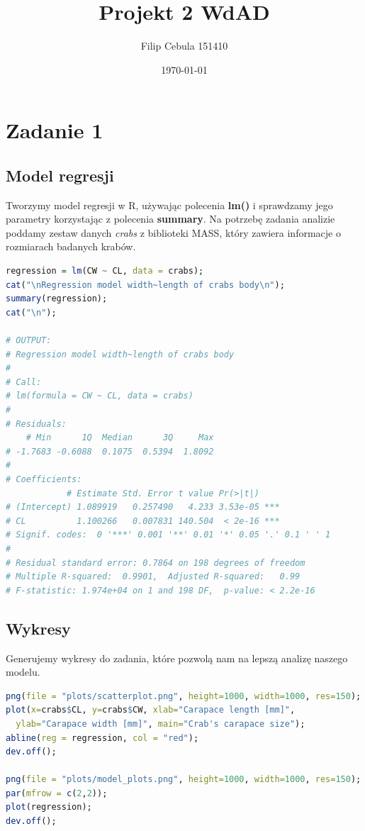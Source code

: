 \documentclass[11pt]{article}
\title{Projekt 2 WdAD}
\author{Filip Cebula 151410}
\date{\today}
\begin{document}
\maketitle
\pagebreak

\section{Zadanie 1}
\subsection{Model regresji}
Tworzymy model regresji w R, używając polecenia \textbf{lm()} i sprawdzamy
jego parametry korzystając z polecenia \textbf{summary}. Na potrzebę zadania
analizie poddamy zestaw danych \textit{crabs} z biblioteki MASS, który
zawiera informacje o rozmiarach badanych krabów.

\begin{lstlisting}[language=R]
regression = lm(CW ~ CL, data = crabs);
cat("\nRegression model width~length of crabs body\n");
summary(regression);
cat("\n");

# OUTPUT:
# Regression model width~length of crabs body
# 
# Call:
# lm(formula = CW ~ CL, data = crabs)
# 
# Residuals:
    # Min      1Q  Median      3Q     Max 
# -1.7683 -0.6088  0.1075  0.5394  1.8092 
# 
# Coefficients:
            # Estimate Std. Error t value Pr(>|t|)    
# (Intercept) 1.089919   0.257490   4.233 3.53e-05 ***
# CL          1.100266   0.007831 140.504  < 2e-16 ***
# Signif. codes:  0 '***' 0.001 '**' 0.01 '*' 0.05 '.' 0.1 ' ' 1
# 
# Residual standard error: 0.7864 on 198 degrees of freedom
# Multiple R-squared:  0.9901,	Adjusted R-squared:   0.99 
# F-statistic: 1.974e+04 on 1 and 198 DF,  p-value: < 2.2e-16
\end{lstlisting}


\subsection{Wykresy}
Generujemy wykresy do zadania, które pozwolą nam na lepszą analizę naszego
modelu.

\begin{lstlisting}[language=R]
png(file = "plots/scatterplot.png", height=1000, width=1000, res=150);
plot(x=crabs$CL, y=crabs$CW, xlab="Carapace length [mm]",
  ylab="Carapace width [mm]", main="Crab's carapace size");
abline(reg = regression, col = "red");
dev.off();

png(file = "plots/model_plots.png", height=1000, width=1000, res=150);
par(mfrow = c(2,2));
plot(regression);
dev.off();
\end{lstlisting}
\end{document}
